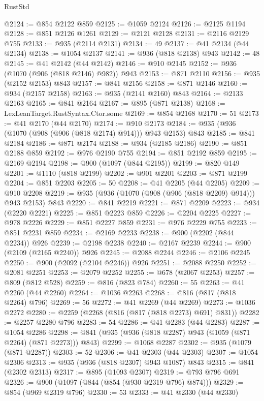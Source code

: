 \begin{lexlean}{RustStd}
\begin{coremodule}
@2124 := @854 @2122 @859
@2125 := @1059 @2124
@2126 := @2125 @1194
@2128 := @851 @2126 @1261
@2129 := @2121 @2128
@2131 := @2116 @2129 @755
@2133 := @935 (@2114 @2131)
@2134 := 49
@2137 := @41 @2134 (@44 @2134)
@2138 := @1054 @2137
@2141 := @936 (@818 @2138) @943
@2142 := 48
@2145 := @41 @2142 (@44 @2142)
@2146 := @910 @2145
@2152 := @936 (@1070 (@906 (@818 @2146) @982)) @943
@2153 := @871 @2110
@2156 := @935 (@2152 @2153) @843
@2157 := @841 @2156
@2158 := @871 @2146
@2160 := @934 (@2157 @2158)
@2163 := @935 (@2141 @2160) @843
@2164 := @2133 @2163
@2165 := @841 @2164
@2167 := @895 (@871 @2138)
@2168 := LexLeanTarget.RustSyntax.Ctor.some
@2169 := @854 @2168
@2170 := 51
@2173 := @41 @2170 (@44 @2170)
@2174 := @910 @2173
@2184 := @935 (@936 (@1070 (@908 (@906 (@818 @2174) @914))) @943 @2153) @843
@2185 := @841 @2184
@2186 := @871 @2174
@2188 := @934 (@2185 @2186)
@2190 := @851 @2188 @859
@2192 := @976 @2190 @755
@2194 := @851 @2192 @859
@2195 := @2169 @2194
@2198 := @900 (@1097 (@844 @2195))
@2199 := @820 @149
@2201 := @1110 (@818 @2199)
@2202 := @901 @2201
@2203 := @871 @2199
@2204 := @851 @2203
@2205 := 50
@2208 := @41 @2205 (@44 @2205)
@2209 := @910 @2208
@2219 := @935 (@936 (@1070 (@908 (@906 (@818 @2209) @914))) @943 @2153) @843
@2220 := @841 @2219
@2221 := @871 @2209
@2223 := @934 (@2220 @2221)
@2225 := @851 @2223 @859
@2226 := @2204 @2225
@2227 := @978 @2226
@2229 := @851 @2227 @859
@2231 := @976 @2229 @755
@2233 := @851 @2231 @859
@2234 := @2169 @2233
@2238 := @900 (@2202 (@844 @2234)) @926
@2239 := @2198 @2238
@2240 := @2167 @2239
@2244 := @900 (@2109 (@2165 @2240)) @926
@2245 := @2088 @2244
@2246 := @2106 @2245
@2250 := @900 (@2092 (@2104 @2246)) @926
@2251 := @2088 @2250
@2252 := @2081 @2251
@2253 := @2079 @2252
@2255 := @678 (@2067 @2253)
@2257 := @809 (@812 @528)
@2259 := @816 (@823 @784)
@2260 := 55
@2263 := @41 @2260 (@44 @2260)
@2264 := @1036 @2263
@2268 := @816 (@817 (@818 @2264) @796)
@2269 := 56
@2272 := @41 @2269 (@44 @2269)
@2273 := @1036 @2272
@2280 := @2259 (@2268 (@816 (@817 (@818 @2273) @691) @831))
@2282 := @2257 @2280 @796
@2283 := 54
@2286 := @41 @2283 (@44 @2283)
@2287 := @1054 @2286
@2298 := @841 (@935 (@936 (@818 @2287) @943 (@1059 (@871 @2264) (@871 @2273))) @843)
@2299 := @1068 @2287
@2302 := @935 (@1079 (@871 @2287))
@2303 := 52
@2306 := @41 @2303 (@44 @2303)
@2307 := @1054 @2306
@2313 := @935 (@936 (@818 @2307) @943 @1087) @843
@2315 := @841 (@2302 @2313)
@2317 := @895 (@1093 @2307)
@2319 := @793 @796 @691
@2326 := @900 (@1097 (@844 (@854 (@930 @2319 @796) @874)))
@2329 := @854 (@969 @2319 @796)
@2330 := 53
@2333 := @41 @2330 (@44 @2330)

\end{coremodule}
\end{lexlean}
